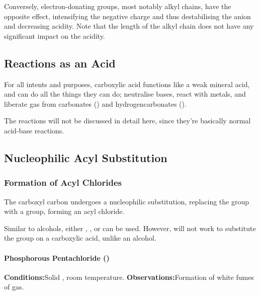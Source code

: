 				Conversely, electron-donating groups, most notably alkyl chains, have the opposite effect, intensifying the negative charge
				and thus destabilising the anion and decreasing acidity. Note that the length of the alkyl chain does not have any significant
				impact on the acidity.



		\subsection{Reactions as an Acid}

			For all intents and purposes, carboxylic acid functions like a weak mineral acid, and can do all the things they can do;
			neutralise bases, react with metals, and liberate  gas from carbonates () and hydrogencarbonates ().

			The reactions will not be discussed in detail here, since they're basically normal acid-base reactions.


		\subsection{Nucleophilic Acyl Substitution}

			\subsubsection{Formation of Acyl Chlorides}

				The carboxyl carbon undergoes a nucleophilic substitution, replacing the  group with a \ch{\Cl} group, forming
				an acyl chloride.

				Similar to alcohols, either , , or  can be used. However,  will
				not work to substitute the  group on a carboxylic acid, unlike an alcohol.


				\paragraph{Phosphorous Pentachloride ()}

				\vspace{1.5em}
				\vbox{\textbf{Conditions:}\tabto{35mm}Solid , room temperature.}
				\vbox{\textbf{Observations:}\tabto{35mm}Formation of white fumes of  gas.}

